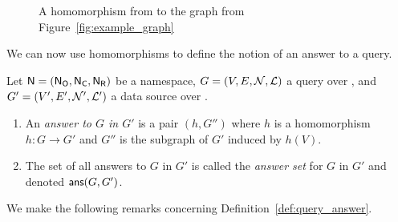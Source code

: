 \newcommand{\tikzhmph}{%
  \begin{scope}[%
    every node/.style={draw=none,fill=none,inner sep=.2mm,align=left},
    every edge/.style={densely dashed,draw=black!70,thick}
  ]
    \path[->]
      (derev) edge                               node[above=.4mm,pos=.56] {\fns$h$} (work1)
      (y.0)   edge[shorten <= -1.5pt]            node[above=.4mm,pos=.16] {\fns$h$} ($(person2.north west)!(y.0)!(person2.south west)$)
    ;
    
    \draw[->,densely dashed,draw=black!70,thick,rounded corners=2mm]
      (x.south) |- node[above=.4mm,pos=.835] {\fns$h$} (item1.194)
    ; 

    \draw[->,densely dashed,draw=black!70,thick,rounded corners=2mm]
      ($(z.south) + (0, 1.5pt)$) |- node[above=.4mm,pos=.60] {\fns$h$} (person3.196)
    ; 
  \end{scope}
}

\begin{figure}[ht]
  \centering
  \caption{A homomorphism from  to the graph from Figure~\ref{fig:example_graph}}
  \label{fig:example_hmph}
\end{figure}

We can now use homomorphisms to define the notion of an answer to a query.
%
\begin{definition}
  \label{def:query_answer}
  Let $\textup{\textsf{N}}=(\mathsf{N}_\mathsf{O},\mathsf{N}_\mathsf{C},\mathsf{N}_\mathsf{R})$ be a namespace, $G = (V,E,\mathcal{N},\mathcal{L})$ a query over \namespace,
  and $G' = (V',E',\mathcal{N}',\mathcal{L}')$ a data source over \namespace.
  \begin{enumerate}
    \item
      An \emph{answer to $G$ in $G'$} is a pair $(h,G'')$
      where $h$ is a homomorphism $h : G \to G'$
      and $G''$ is the subgraph of $G'$ induced by $h(V)$.
    \item
      The set of all answers to $G$ in $G'$ is called the \emph{answer set} for $G$ in $G'$
      and denoted $\textsf{ans}(G,G')$.
  \end{enumerate}
\end{definition}
%
We make the following remarks concerning Definition~\ref{def:query_answer}.

